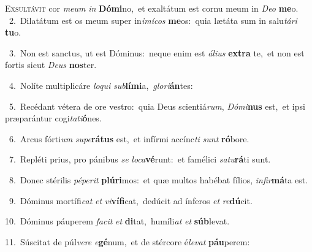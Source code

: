 \lettrine{\initial\textcolor{\initialcolor}{E}}{xsultávit} cor \textit{me}\-\textit{um} \textit{in} \textbf{Dó}\-\textbf{mi}no,~\star et exaltátum est cornu meum in \textit{De}\-\textit{o} \textbf{me}\-o.\\
{\numbfont\textcolor{\numbcolor}{~2.}}~Dilatátum est os meum super in\-\textit{i}\-\textit{mí}\textit{cos} \textbf{me}\-os:~\star quia lætáta sum in salu\-\textit{tá}\-\textit{ri} \textbf{tu}\-o.\par
{\numbfont\textcolor{\numbcolor}{~3.}}~Non est sanctus, ut est Dóminus:~\dagger neque enim est \textit{á}\-\textit{li}\textit{us} \textbf{ex}\-\textbf{tra} te,~\star et non est fortis sicut \textit{De}\-\textit{us} \textbf{nos}\-ter.\par
{\numbfont\textcolor{\numbcolor}{~4.}}~Nolíte multiplicáre \textit{lo}\-\textit{qui} \textit{sub}\-\textbf{lí}\textbf{mi}a,~\star \textit{glo}\-\textit{ri}\textbf{án}tes:\par
{\numbfont\textcolor{\numbcolor}{~5.}}~Recédant vétera de ore vestro:~\dagger quia Deus scientiá\-\textit{rum}\-, \textit{Dó}\-\textit{mi}\textbf{nus} est,~\star et ipsi præparántur cogi\-\textit{ta}\-\textit{ti}\textbf{ó}nes.\par
{\numbfont\textcolor{\numbcolor}{~6.}}~Arcus fórti\textit{um} \textit{su}\-\textit{pe}\textbf{rá}\textbf{tus} est,~\star et infírmi accínc\textit{ti} \textit{sunt} \textbf{ró}\-bore.\par
{\numbfont\textcolor{\numbcolor}{~7.}}~Repléti prius, pro pánibus \textit{se} \textit{lo}\-\textit{ca}\textbf{vé}runt:~\star et famélici \textit{sa}\-\textit{tu}\textbf{rá}ti sunt.\par
{\numbfont\textcolor{\numbcolor}{~8.}}~Donec stérilis \textit{pé}\-\textit{pe}\textit{rit} \textbf{plú}\-\textbf{ri}mos:~\star et quæ multos habébat fílios, \textit{in}\-\textit{fir}\textbf{má}ta est.\par
{\numbfont\textcolor{\numbcolor}{~9.}}~Dóminus mortífi\textit{cat} \textit{et} \textit{vi}\-\textbf{ví}\textbf{fi}cat,~\star dedúcit ad ínferos \textit{et} \textit{re}\-\textbf{dú}cit.\par
{\numbfont\textcolor{\numbcolor}{10.}}~Dóminus páuperem \textit{fa}\-\textit{cit} \textit{et} \textbf{di}\-tat,~\star humíli\textit{at} \textit{et} \textbf{súb}\-levat.\par
{\numbfont\textcolor{\numbcolor}{11.}}~Súscitat de púl\-\textit{ve}\-\textit{re} \textit{e}\-\textbf{gé}num,~\star et de stércore é\-\textit{le}\-\textit{vat} \textbf{páu}\-perem:\par
